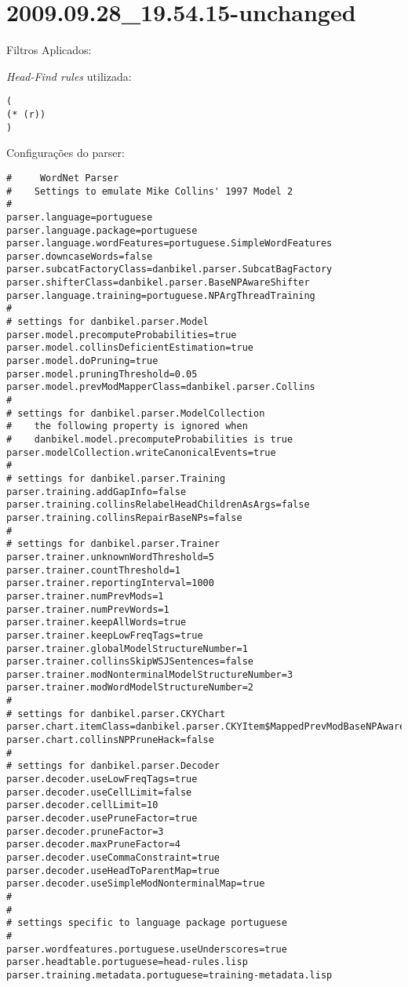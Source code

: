 \section{2009.09.28_19.54.15-unchanged} %
\label{sec:exp:2009.09.28_19.54.15-unchanged}

Filtros Aplicados:

\begin{itemize}
  
\end{itemize}

\emph{Head-Find rules} utilizada:

\scriptsize
\begin{verbatim}
(
(* (r))
)

\end{verbatim}

\normalsize

Configurações do parser:

\scriptsize
\begin{verbatim}
#     WordNet Parser
#    Settings to emulate Mike Collins' 1997 Model 2
#
parser.language=portuguese
parser.language.package=portuguese
parser.language.wordFeatures=portuguese.SimpleWordFeatures
parser.downcaseWords=false
parser.subcatFactoryClass=danbikel.parser.SubcatBagFactory
parser.shifterClass=danbikel.parser.BaseNPAwareShifter
parser.language.training=portuguese.NPArgThreadTraining
#
# settings for danbikel.parser.Model
parser.model.precomputeProbabilities=true
parser.model.collinsDeficientEstimation=true
parser.model.doPruning=true
parser.model.pruningThreshold=0.05
parser.model.prevModMapperClass=danbikel.parser.Collins
#
# settings for danbikel.parser.ModelCollection
#    the following property is ignored when
#    danbikel.model.precomputeProbabilities is true
parser.modelCollection.writeCanonicalEvents=true
#
# settings for danbikel.parser.Training
parser.training.addGapInfo=false
parser.training.collinsRelabelHeadChildrenAsArgs=false
parser.training.collinsRepairBaseNPs=false
#
# settings for danbikel.parser.Trainer
parser.trainer.unknownWordThreshold=5
parser.trainer.countThreshold=1
parser.trainer.reportingInterval=1000
parser.trainer.numPrevMods=1
parser.trainer.numPrevWords=1
parser.trainer.keepAllWords=true
parser.trainer.keepLowFreqTags=true
parser.trainer.globalModelStructureNumber=1
parser.trainer.collinsSkipWSJSentences=false
parser.trainer.modNonterminalModelStructureNumber=3
parser.trainer.modWordModelStructureNumber=2
#
# settings for danbikel.parser.CKYChart
parser.chart.itemClass=danbikel.parser.CKYItem$MappedPrevModBaseNPAware
parser.chart.collinsNPPruneHack=false
#
# settings for danbikel.parser.Decoder
parser.decoder.useLowFreqTags=true
parser.decoder.useCellLimit=false
parser.decoder.cellLimit=10
parser.decoder.usePruneFactor=true
parser.decoder.pruneFactor=3
parser.decoder.maxPruneFactor=4
parser.decoder.useCommaConstraint=true
parser.decoder.useHeadToParentMap=true
parser.decoder.useSimpleModNonterminalMap=true
#
#
# settings specific to language package portuguese
#
parser.wordfeatures.portuguese.useUnderscores=true
parser.headtable.portuguese=head-rules.lisp
parser.training.metadata.portuguese=training-metadata.lisp

\end{verbatim}

